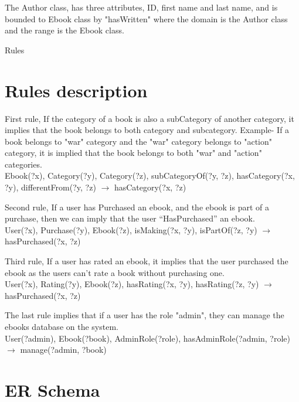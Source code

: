 ﻿\documentclass[a4paper,11pt]{article}
\begin{document}
The Author class, has three attributes, ID, first name and last name, and is bounded to Ebook class by "hasWritten" where the domain is the Author class and the range is the Ebook class. 

Rules

\section{Rules description}
First rule, If the category of a book is also a subCategory of another category, it implies that the book belongs to both category and subcategory. Example- If a book belongs to "war" category and the "war" category belongs to "action" category, it is implied that the book belongs to both "war" and "action" categories.\\
Ebook(?x), Category(?y), Category(?z), subCategoryOf(?y, ?z), hasCategory(?x, ?y), differentFrom(?y, ?z) $\rightarrow$ hasCategory(?x, ?z)

Second rule, If a user has Purchased an ebook, and the ebook is part of a purchase, then we can imply that the user “HasPurchased” an ebook. \\
User(?x), Purchase(?y), Ebook(?z), isMaking(?x, ?y), isPartOf(?z, ?y) $\rightarrow$ hasPurchased(?x, ?z)

Third rule, If a user has rated an ebook, it implies that the user purchased the ebook as the users can't rate a book without purchasing one. \\

User(?x), Rating(?y), Ebook(?z), hasRating(?x, ?y), hasRating(?z, ?y) $\rightarrow$ hasPurchased(?x, ?z)

The last rule implies that if a user has the role "admin", they can manage the ebooks database on the system. \\
User(?admin), Ebook(?book), AdminRole(?role), hasAdminRole(?admin, ?role) $\rightarrow$ manage(?admin, ?book)

\section{ER Schema}
\end{document}
